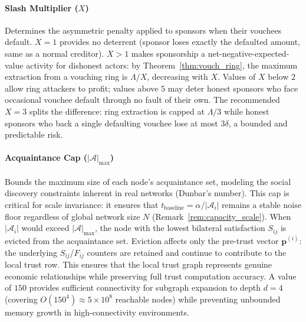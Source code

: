 \documentclass[11pt]{article}
\begin{document}
\paragraph{Slash Multiplier ($X$)}
Determines the asymmetric penalty applied to sponsors when their vouchees default. $X = 1$ provides no deterrent (sponsor loses exactly the defaulted amount, same as a normal creditor). $X > 1$ makes sponsorship a net-negative-expected-value activity for dishonest actors: by Theorem~\ref{thm:vouch_ring}, the maximum extraction from a vouching ring is $\Lambda / X$, decreasing with $X$. Values of $X$ below $2$ allow ring attackers to profit; values above $5$ may deter honest sponsors who face occasional vouchee default through no fault of their own. The recommended $X = 3$ splits the difference: ring extraction is capped at $\Lambda/3$ while honest sponsors who back a single defaulting vouchee lose at most $3\delta$, a bounded and predictable risk.

\paragraph{Acquaintance Cap ($|\mathcal{A}|_{\max}$)}
Bounds the maximum size of each node's acquaintance set, modeling the social discovery constraints inherent in real networks (Dunbar's number). This cap is critical for scale invariance: it ensures that $t_{\text{baseline}} = \alpha / |\mathcal{A}_i|$ remains a stable noise floor regardless of global network size $N$ (Remark~\ref{rem:capacity_scale}). When $|\mathcal{A}_i|$ would exceed $|\mathcal{A}|_{\max}$, the node with the lowest bilateral satisfaction $S_{ij}$ is evicted from the acquaintance set. Eviction affects only the pre-trust vector $\mathbf{p}^{(i)}$: the underlying $S_{ij}$/$F_{ij}$ counters are retained and continue to contribute to the local trust row. This ensures that the local trust graph represents genuine economic relationships while preserving full trust computation accuracy. A value of $150$ provides sufficient connectivity for subgraph expansion to depth $d = 4$ (covering $O(150^4) \approx 5 \times 10^8$ reachable nodes) while preventing unbounded memory growth in high-connectivity environments.
\end{document}
